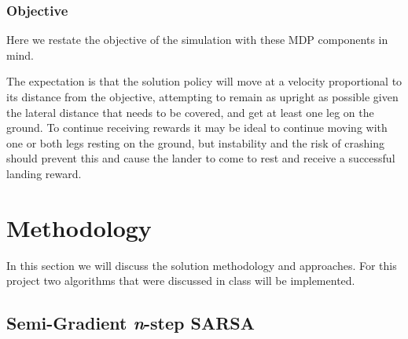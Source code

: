 \documentclass[journal]{IEEEtran}
\begin{document}
\subsubsection{Objective}
Here we restate the objective of the simulation with these MDP components in mind.

The expectation is that the solution policy will move at a velocity proportional to 
its distance from the objective, attempting to remain as upright as possible given the lateral
distance that needs to be covered, and get at least one leg on the ground.
To continue receiving rewards it may be ideal to continue moving with one or both legs resting on 
the ground, but instability and the risk of crashing should prevent this and cause the lander 
to come to rest and receive a successful landing reward.

\section{Methodology}
\label{sec:methodology}
In this section we will discuss the solution methodology and approaches.
For this project two algorithms that were discussed in class will be implemented.


\subsection{Semi-Gradient \emph{n}-step SARSA}
\end{document}
